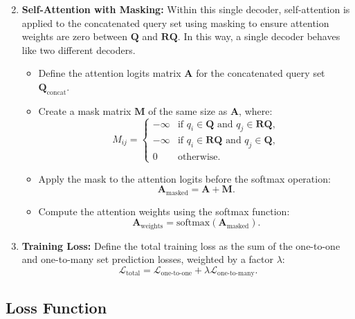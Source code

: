 \begin{enumerate}
\begin{equation}
    \end{equation}
    \item \textbf{Self-Attention with Masking:} Within this single decoder, self-attention is applied to the concatenated query set using masking to ensure attention weights are zero between $\mathbf{Q}$ and $\mathbf{RQ}$. In this way, a single decoder behaves like two different decoders. 
    \begin{itemize}
        \item Define the attention logits matrix $\mathbf{A}$ for the concatenated query set $\mathbf{Q}_{\text{concat}}$.
        \item Create a mask matrix $\mathbf{M}$ of the same size as $\mathbf{A}$, where:
        \begin{equation}
        M_{ij} = 
            \begin{cases} 
            -\infty & \text{if } q_i \in \mathbf{Q} \text{ and } q_j \in \mathbf{RQ}, \\
            -\infty & \text{if } q_i \in \mathbf{RQ} \text{ and } q_j \in \mathbf{Q}, \\
            0 & \text{otherwise}.
            \end{cases}
        \end{equation}
        \item Apply the mask to the attention logits before the softmax operation:
        \begin{equation}
            \mathbf{A}_{\text{masked}} = \mathbf{A} + \mathbf{M}.
        \end{equation}
        \item Compute the attention weights using the softmax function:
        \begin{equation}
            \mathbf{A}_{\text{weights}} = \text{softmax}(\mathbf{A}_{\text{masked}}).
        \end{equation}
    \end{itemize}
    \item \textbf{Training Loss:} Define the total training loss as the sum of the one-to-one and one-to-many set prediction losses, weighted by a factor $\lambda$:
    \begin{equation}
        \mathcal{L}_{\text{total}} = \mathcal{L}_{\text{one-to-one}} + \lambda \mathcal{L}_{\text{one-to-many}}.
    \end{equation}
\end{enumerate}

\subsection{Loss Function}
\label{sup_sec: experiments_loss_functions}

